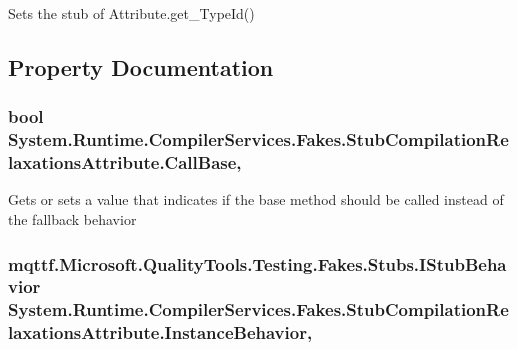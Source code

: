 Sets the stub of Attribute.\-get\-\_\-\-Type\-Id()



\subsection{Property Documentation}
\hypertarget{class_system_1_1_runtime_1_1_compiler_services_1_1_fakes_1_1_stub_compilation_relaxations_attribute_a879b091be5c435bfa38974dcacdb5292}{
\subsubsection[{Call\-Base}]{\setlength{\rightskip}{0pt plus 5cm}bool System.\-Runtime.\-Compiler\-Services.\-Fakes.\-Stub\-Compilation\-Relaxations\-Attribute.\-Call\-Base\hspace{0.3cm}{\ttfamily [get]}, {\ttfamily [set]}}}\label{class_system_1_1_runtime_1_1_compiler_services_1_1_fakes_1_1_stub_compilation_relaxations_attribute_a879b091be5c435bfa38974dcacdb5292}


Gets or sets a value that indicates if the base method should be called instead of the fallback behavior

\hypertarget{class_system_1_1_runtime_1_1_compiler_services_1_1_fakes_1_1_stub_compilation_relaxations_attribute_af4f71e4081f279df9d2bc1c2a745e0d3}{
\subsubsection[{Instance\-Behavior}]{\setlength{\rightskip}{0pt plus 5cm}mqttf.\-Microsoft.\-Quality\-Tools.\-Testing.\-Fakes.\-Stubs.\-I\-Stub\-Behavior System.\-Runtime.\-Compiler\-Services.\-Fakes.\-Stub\-Compilation\-Relaxations\-Attribute.\-Instance\-Behavior\hspace{0.3cm}{\ttfamily [get]}, {\ttfamily [set]}}}\label{class_system_1_1_runtime_1_1_compiler_services_1_1_fakes_1_1_stub_compilation_relaxations_attribute_af4f71e4081f279df9d2bc1c2a745e0d3}


